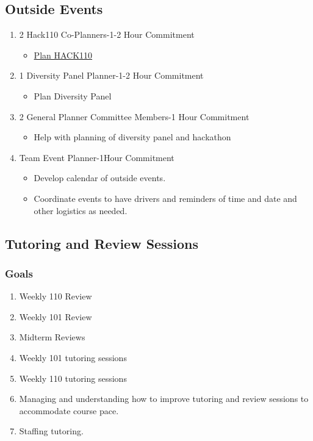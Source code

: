 \documentclass[a4paper]{article}
\begin{document}
\subsection{Outside Events}
\begin{enumerate}
\item 2 Hack110 Co-Planners-1-2 Hour Commitment
\begin{itemize}
\item \hyperref[hackathon]{Plan HACK110}
\end{itemize}
\item 1 Diversity Panel Planner-1-2 Hour Commitment 
\begin{itemize}
\item Plan Diversity Panel
\end{itemize}
\item 2 General Planner Committee Members-1 Hour Commitment
\begin{itemize}
\item Help with planning of diversity panel and hackathon
\end{itemize}
\item Team Event Planner-1Hour Commitment
\begin{itemize}
\item Develop calendar of outside events. 
\item Coordinate events to have drivers and reminders of time and date and other logistics as needed. 
\end{itemize}
\end{enumerate}
\subsection{Tutoring and Review Sessions}
\subsubsection{Goals}
\begin{enumerate}
\item Weekly 110 Review
\item Weekly 101 Review
\item Midterm Reviews
\item Weekly 101 tutoring sessions
\item Weekly 110 tutoring sessions
\item Managing and understanding how to improve tutoring and review sessions to accommodate course pace. 
\item Staffing tutoring. 
\end{enumerate}
\end{document}

